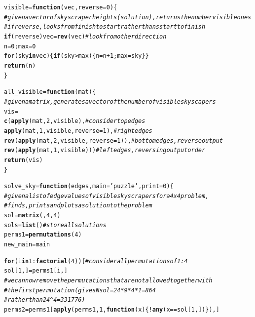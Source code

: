 \documentclass[12pt]{article}\usepackage[]{graphicx}\usepackage[]{color}
\makeatletter
\newcommand{\hlnum}[1]{\textcolor[rgb]{0.686,0.059,0.569}{#1}}%
\newcommand{\hlstr}[1]{\textcolor[rgb]{0.192,0.494,0.8}{#1}}%
\newcommand{\hlcom}[1]{\textcolor[rgb]{0.678,0.584,0.686}{\textit{#1}}}%
\newcommand{\hlopt}[1]{\textcolor[rgb]{0,0,0}{#1}}%
\newcommand{\hlstd}[1]{\textcolor[rgb]{0.345,0.345,0.345}{#1}}%
\newcommand{\hlkwa}[1]{\textcolor[rgb]{0.161,0.373,0.58}{\textbf{#1}}}%
\newcommand{\hlkwb}[1]{\textcolor[rgb]{0.69,0.353,0.396}{#1}}%
\newcommand{\hlkwc}[1]{\textcolor[rgb]{0.333,0.667,0.333}{#1}}%
\newcommand{\hlkwd}[1]{\textcolor[rgb]{0.737,0.353,0.396}{\textbf{#1}}}%
\newenvironment{kframe}{%
 \def\at@end@of@kframe{}%
 \ifinner\ifhmode%
  \def\at@end@of@kframe{\end{minipage}}%
  \begin{minipage}{\columnwidth}%
 \fi\fi%
 \def\FrameCommand##1{\hskip\@totalleftmargin \hskip-\fboxsep
 \colorbox{shadecolor}{##1}\hskip-\fboxsep
     \hskip-\linewidth \hskip-\@totalleftmargin \hskip\columnwidth}%
 \MakeFramed {\advance\hsize-\width
   \@totalleftmargin\z@ \linewidth\hsize
   \@setminipage}}%
 {\par\unskip\endMakeFramed%
 \at@end@of@kframe}
\newenvironment{knitrout}{}{} %
\makeatother
\begin{document}
\begin{knitrout}
\color{fgcolor}\begin{kframe}
\begin{alltt}
\hlstd{visible} \hlkwb{=} \hlkwa{function}\hlstd{(}\hlkwc{vec}\hlstd{,} \hlkwc{reverse} \hlstd{=} \hlnum{0}\hlstd{)\{}
  \hlcom{#given a vector of skyscraper heights  (solution), returns the number visible ones}
  \hlcom{#if reverse, looks from finish to start rather thans start to finish}
  \hlkwa{if} \hlstd{(reverse) vec} \hlkwb{=} \hlkwd{rev}\hlstd{(vec)} \hlcom{#look from other direction}
  \hlstd{n} \hlkwb{=} \hlnum{0}\hlstd{; max} \hlkwb{=} \hlnum{0}
  \hlkwa{for} \hlstd{(sky} \hlkwa{in} \hlstd{vec)\{} \hlkwa{if} \hlstd{(sky} \hlopt{>} \hlstd{max)\{ n} \hlkwb{=} \hlstd{n}\hlopt{+}\hlnum{1}\hlstd{; max} \hlkwb{=} \hlstd{sky \} \}}
  \hlkwd{return}\hlstd{(n)}
\hlstd{\}}

\hlstd{all_visible} \hlkwb{=} \hlkwa{function}\hlstd{(}\hlkwc{mat}\hlstd{)\{}
  \hlcom{#given a matrix, generates a vector of the number of visible skyscapers}
  \hlstd{vis} \hlkwb{=}
    \hlkwd{c}\hlstd{(}\hlkwd{apply}\hlstd{(mat,} \hlnum{2}\hlstd{, visible),} \hlcom{#consider top edges}
    \hlkwd{apply}\hlstd{(mat,} \hlnum{1}\hlstd{, visible,} \hlkwc{reverse} \hlstd{=} \hlnum{1}\hlstd{),} \hlcom{#right edges}
    \hlkwd{rev}\hlstd{(}\hlkwd{apply}\hlstd{(mat,} \hlnum{2}\hlstd{, visible,} \hlkwc{reverse} \hlstd{=} \hlnum{1}\hlstd{)),} \hlcom{#bottom edges, reverse output}
    \hlkwd{rev}\hlstd{(}\hlkwd{apply}\hlstd{(mat,} \hlnum{1}\hlstd{, visible)))} \hlcom{#left edges, reversing output order}
  \hlkwd{return}\hlstd{(vis)}
\hlstd{\}}

\hlstd{solve_sky} \hlkwb{=} \hlkwa{function}\hlstd{(}\hlkwc{edges}\hlstd{,}\hlkwc{main} \hlstd{=} \hlstr{'puzzle'}\hlstd{,} \hlkwc{print}\hlstd{=}\hlnum{0}\hlstd{)\{}
  \hlcom{#given a list of edge values of visible skyscrapers for a 4x4 problem,}
  \hlcom{#finds, prints and plots a solution to the problem}
  \hlstd{sol} \hlkwb{=} \hlkwd{matrix}\hlstd{(,}\hlnum{4}\hlstd{,}\hlnum{4}\hlstd{)}
  \hlstd{sols} \hlkwb{=} \hlkwd{list}\hlstd{()} \hlcom{#store all solutions}
  \hlstd{perms1} \hlkwb{=} \hlkwd{permutations}\hlstd{(}\hlnum{4}\hlstd{)}
  \hlstd{new_main} \hlkwb{=} \hlstd{main}

  \hlkwa{for} \hlstd{(i} \hlkwa{in} \hlnum{1}\hlopt{:}\hlkwd{factorial}\hlstd{(}\hlnum{4}\hlstd{))\{} \hlcom{#consider all permutations of 1:4}
    \hlstd{sol[}\hlnum{1}\hlstd{,]} \hlkwb{=} \hlstd{perms1[i,]}
    \hlcom{#we can now remove the permutations that are not allowed together with}
    \hlcom{#the first permutation (gives Nsol = 24*9*4*1 = 864}
      \hlcom{#rather than 24^4 = 331776)}
    \hlstd{perms2} \hlkwb{=} \hlstd{perms1[}\hlkwd{apply}\hlstd{(perms1,} \hlnum{1}\hlstd{,} \hlkwa{function}\hlstd{(}\hlkwc{x}\hlstd{)\{} \hlopt{!}\hlkwd{any}\hlstd{(x} \hlopt{==} \hlstd{sol[}\hlnum{1}\hlstd{,]) \}), ]}


\end{alltt}
\end{kframe}
\end{knitrout}
\end{document}
